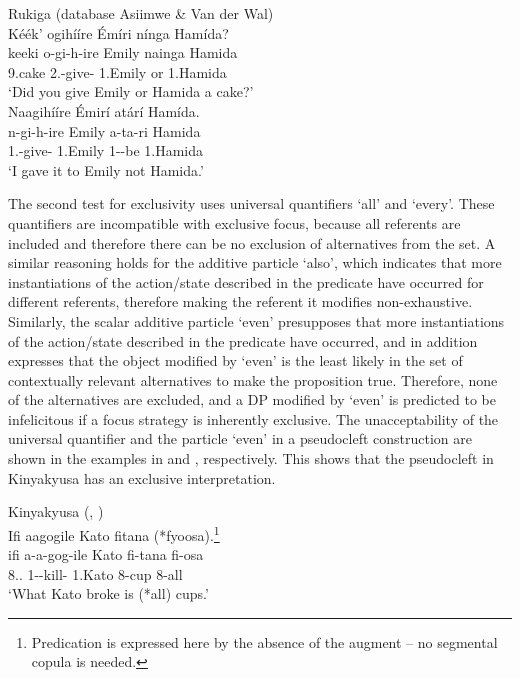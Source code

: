 \documentclass[output=paper]{langscibook}
\begin{document}
\ea
Rukiga (database Asiimwe \& Van der Wal)\\
\label{bkm:Ref131672872}Kéék’ ogihííre \'{E}míri nínga Hamída?\\
\gll
keeki  o-gi-h-ire  Emily  nainga  Hamida\\
9.cake  2\SG.\OM{}-give-\PFV{}  1.Emily  or  1.Hamida\\
\glt
‘Did you give Emily or Hamida a cake?’\\

\sn
Naagihííre \'{E}mirí atárí Hamída.\\
\gll
n-gi-h-ire  Emily  a-ta-ri  Hamida\\
1\SG.\OM{}-give-\PFV{}  1.Emily  1\SM-\NEG{}-be  1.Hamida\\
\glt
‘I gave it to Emily not Hamida.’\\


\z

The second test for exclusivity uses universal quantifiers ‘all’ and ‘every’. These quantifiers are incompatible with exclusive focus, because all referents are included and therefore there can be no exclusion of alternatives from the set. A similar reasoning holds for the additive particle ‘also’, which indicates that more instantiations of the action/state described in the predicate have occurred for different referents, therefore making the referent it modifies non-exhaustive. Similarly, the scalar additive particle ‘even’ presupposes that more instantiations of the action/state described in the predicate have occurred, and in addition expresses that the object modified by ‘even’ is the least likely in the set of contextually relevant alternatives to make the proposition true. Therefore, none of the alternatives are excluded, and a DP modified by ‘even’ is predicted to be infelicitous if a focus strategy is inherently exclusive. The unacceptability of the universal quantifier and the particle ‘even’ in a pseudocleft construction are shown in the examples in  and , respectively. This shows that the pseudocleft in Kinyakyusa has an exclusive interpretation.

\ea
\label{ex:kinyakyusa-kato}
Kinyakyusa (, \cite{chapters/kinyakyusa})\\
Ifi aagogile Kato fitana (*fyoosa).\footnote{Predication is expressed here by the absence of the augment -- no segmental copula is needed.}\\
\gll
ifi  a-a-gog-ile  Kato  fi-tana  fi-osa\\
8.\DEM.\PROX{}  1\SM-\PST{}-kill-\PFV{}  1.Kato  8-cup  8-all\\
\glt
‘What Kato broke is (*all) cups.’\\
\end{document}
